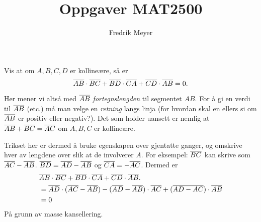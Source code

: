 \documentclass[11pt, norsk]{article}
\begin{document}
\title{Oppgaver MAT2500}
\author{Fredrik Meyer}
\maketitle 

\begin{oppg}
Vis at om $A,B,C,D$ er kollineære, så er 
\[
\overline{AB} \cdot \overline{BC}  + \overline{BD} \cdot \overline{CA} + \overline{CD} \cdot \overline{AB} = 0.
\]
\end{oppg}
\begin{losn}
 Her mener vi altså med $\overline{AB}$ \emph{fortegnslengden} til segmentet $AB$. For å gi en verdi til $\overline{AB}$ (etc.) må man velge en \emph{retning} langs linja (for hvordan skal en ellers si om $\overline{AB}$ er positiv eller negativ?). Det som holder uansett er nemlig at $\overline{AB} + \overline{BC} = \overline{AC}$ om $A,B,C$ er kollineære.

Trikset her er dermed å bruke egenskapen over gjentatte ganger, og omskrive hver av lengdene over slik at de involverer $A$. For eksempel: $\overline{BC}$ kan skrive som $\overline{AC}-\overline{AB}$. $\overline{BD} = \overline{AD}-\overline{AB}$ og $\overline{CA} = -\overline{AC}$. Dermed er
\begin{align*}
& \overline{AB} \cdot \overline{BC}  + \overline{BD} \cdot \overline{CA} + \overline{CD} \cdot \overline{AB}. \\
&= \overline{AD}\cdot (\overline{AC}-\overline{AB}) - (\overline{AD}-\overline{AB})\cdot \overline{AC} + (\overline{AD-AC}) \cdot \overline{AB} \\
&= 0
\end{align*}
På grunn av masse kansellering.
\end{losn}
\end{document}
